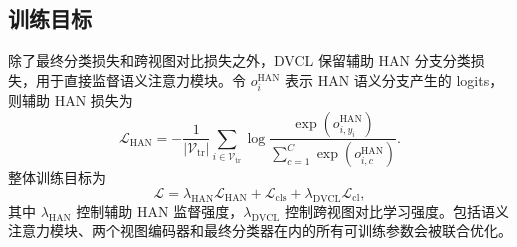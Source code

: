 \subsection{训练目标}

除了最终分类损失和跨视图对比损失之外，DVCL 保留辅助 HAN 分支分类损失，用于直接监督语义注意力模块。令 $o_i^{\mathrm{HAN}}$ 表示 HAN 语义分支产生的 logits，则辅助 HAN 损失为
\begin{equation}
\mathcal{L}_{\mathrm{HAN}}
=
-\frac{1}{|\mathcal{V}_{\mathrm{tr}}|}
\sum_{i\in\mathcal{V}_{\mathrm{tr}}}
\log
\frac{\exp(o^{\mathrm{HAN}}_{i,y_i})}
{\sum_{c=1}^{C}\exp(o^{\mathrm{HAN}}_{i,c})}.
\end{equation}
整体训练目标为
\begin{equation}
\mathcal{L}
=
\lambda_{\mathrm{HAN}}\mathcal{L}_{\mathrm{HAN}}
+
\mathcal{L}_{\mathrm{cls}}
+
\lambda_{\mathrm{DVCL}}\mathcal{L}_{\mathrm{cl}},
\end{equation}
其中 $\lambda_{\mathrm{HAN}}$ 控制辅助 HAN 监督强度，$\lambda_{\mathrm{DVCL}}$ 控制跨视图对比学习强度。包括语义注意力模块、两个视图编码器和最终分类器在内的所有可训练参数会被联合优化。
